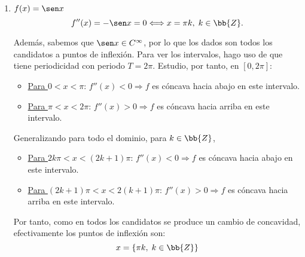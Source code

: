 \begin{ejercicio}
\begin{enumerate}
        \item $f(x)=\sen x$
        \begin{equation*}
            f''(x) = -\sen x = 0 \Longleftrightarrow x={\pi}k, \;k\in \bb{Z}.
        \end{equation*}

        Además, sabemos que $\sen x \in C^{\infty}$, por lo que los dados son todos los candidatos a puntos de inflexión. Para ver los intervalos, hago uso de que tiene periodicidad con periodo $T=2\pi$. Estudio, por tanto, en $[0,2\pi]$:
        \begin{itemize}
            \item \underline{Para $0<x<\pi$}:
            $f''(x)<0\Longrightarrow f$ es cóncava hacia abajo en este intervalo.

            \item \underline{Para $\pi<x<2\pi$}:
            $f''(x)>0\Longrightarrow f$ es cóncava hacia arriba en este intervalo.
        \end{itemize}

        Generalizando para todo el dominio, para $k\in \bb{Z}$,
        \begin{itemize}
            \item \underline{Para $2k\pi<x<(2k+1)\pi$}:
            $f''(x)<0\Longrightarrow f$ es cóncava hacia abajo en este intervalo.

            \item \underline{Para $(2k+1)\pi<x<2(k+1)\pi$}:
            $f''(x)>0\Longrightarrow f$ es cóncava hacia arriba en este intervalo.
        \end{itemize}
        
        
        Por tanto, como en todos los candidatos se produce un cambio de concavidad, efectivamente los puntos de inflexión son:
        \begin{equation*}
            x=\{\pi k, \;k\in \bb{Z}\}
        \end{equation*}
    \end{enumerate}
\end{ejercicio}


